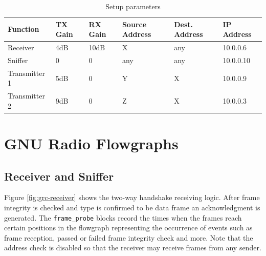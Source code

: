 \begin{table}
	\label{tab:measurement-parameters}
	\begin{center}
		\begin{tabular}{p{2.5cm}p{2cm}p{2cm}p{1.5cm}p{1.5cm}p{2cm}}
			\toprule
			Function & TX Gain & RX Gain & Source Address & Dest. Address & IP Address\\
			\midrule
			Receiver 		& 4dB 	& 10dB 	& X 	& any	& 10.0.0.6\\
			Sniffer 		& 0 	& 0 	& any 	& any	& 10.0.0.10 \\
			Transmitter 1 	& 5dB 	& 0 	& Y 	& 	X 	& 10.0.0.9 \\
			Transmitter 2	& 9dB 	& 0 	& Z 	& 	X 	& 10.0.0.3 \\
			\bottomrule	
		\end{tabular}\caption{Setup parameters}
	\end{center}
\end{table}


\section{GNU Radio Flowgraphs}

%
%

\subsection{Receiver and Sniffer}

Figure \ref{fig:grc-receiver} shows the two-way handshake receiving logic. After frame integrity is checked and type is confirmed to be data frame an acknowledgment is generated. The \texttt{frame\_probe} blocks record the times when the frames reach certain positions in the flowgraph representing the occurrence of events such as frame reception, passed or failed frame integrity check and more. Note that the address check is disabled so that the receiver may receive frames from any sender.

